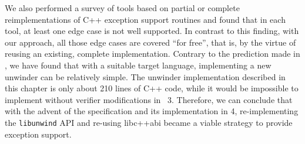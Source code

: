 We also performed a survey of tools based on partial or complete
reimplementations of C++ exception support routines and found that in
each tool, at least one edge case is not well supported. In contrast to
this finding, with our approach, all those edge cases are covered ``for
free'', that is, by the virtue of reusing an existing, complete
implementation. Contrary to the prediction made
in , we have found that with a suitable
target language, implementing a new unwinder can be relatively simple.
The unwinder implementation described in this chapter is only about 210
lines of C++ code, while it would be impossible to implement without
verifier modifications in \divine{}~3. Therefore, we can conclude that with
the advent of the \divm{} specification  and its
implementation in \divine{} 4, re-implementing the \texttt{libunwind} API
and re-using libc++abi became a viable strategy to provide
exception support.
